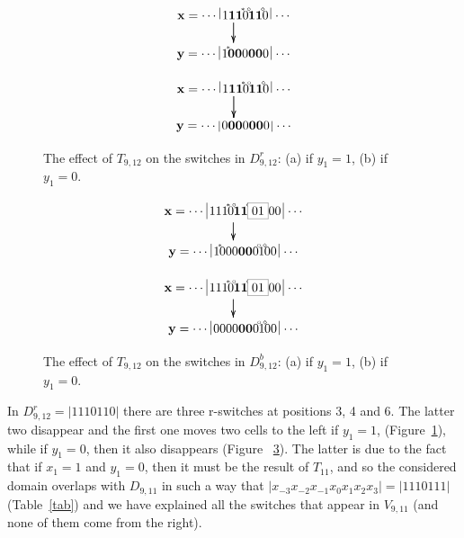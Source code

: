 \documentclass{sn-jnl}
\newcommand{\lllp}{\vline}
\newcommand{\bx}{\mathbf{x}}
\newcommand{\by}{\mathbf{y}}
\newcommand{\gn}[1]{\!^{{}^{{#1}}}\!\!}
\begin{document}
\begin{figure}[h!b]
    \centering
    \begin{subfigure}{0.46\textwidth}
{\scriptsize\[
\xymatrix@C=0.2cm@R=0.5cm{ 
\bx = \cdots \;\lllp  1{\boldsymbol{11}}\gn{*}0\gn{\circ}{\boldsymbol{11}}\gn{\diamond} \ar[d]  0\,\lllp\,\cdots\ar[d]  \\
\by = \cdots \;\lllp1\gn{*}{\boldsymbol{00}}0{\boldsymbol{00}} 0\,\lllp\,\cdots 
}
\]}
    \caption{}
    \label{fig:t9t12(a)}
\end{subfigure}
\hfill
\begin{subfigure}{0.45\textwidth}
{\scriptsize\[
\xymatrix@C=0.2cm@R=0.5cm{ 
\bx = \cdots \;\lllp 1{\boldsymbol{11}}\gn{*}0\gn{\circ}{\boldsymbol{11}}\gn{\diamond} \ar[d]  0\,\lllp\,\cdots\ar[d]  \\
\by = \cdots \;\lllp0{\boldsymbol{00}}0{\boldsymbol{00}} 0\,\lllp\,\cdots 
}
\]}
    \caption{}
    \label{fig:t9t12(b)} 
\end{subfigure}
\caption{The effect of $T_{9,12}$ on the switches in $D_{9,12}^r$:
        (a) if $y_1=1$, (b) if $y_1=0$.}
\end{figure}
\begin{figure}[h!]
    \centering
    \begin{subfigure}{0.46\textwidth}
{\scriptsize\[
\xymatrix@C=0.2cm@R=0.5cm{ 
\bx = \cdots \;\lllp  111\gn{*}0\gn{\circ}{\boldsymbol{11}} \ar[d]  \gn{\diamond}\fcolorbox{gray}{white}{01}00\,\lllp\,\cdots\ar[d]  \\
\by = \cdots \;\lllp1\gn{*}000{\boldsymbol{00}}0  \gn{\circ}1\gn{\diamond}00\,\lllp\,\cdots 
}
\]}
    \caption{}
    \label{fig:t9t12-cd(a)}
\end{subfigure}
\hfill
\begin{subfigure}{0.45\textwidth}
{\scriptsize\[
\xymatrix@C=0.2cm@R=0.5cm{ 
\bx =\cdots \;\lllp  {111}\gn{*}0\gn{\circ}\boldsymbol{11} \ar[d]  \gn{\diamond}\fcolorbox{gray}{white}{01}00\,\lllp\,\cdots\ar[d]  \\
\by = \cdots \;\lllp0000\boldsymbol{00}0   \gn{\circ}1\gn{\diamond}00\,\lllp\,\cdots 
}
\]}
    \caption{}
    \label{fig:t9t12-cd(b)} 
\end{subfigure}
\caption{The effect of $T_{9,12}$ on the switches in $D_{9,12}^b$: 
        (a) if $y_1=1$, (b) if $y_1=0$.}
\end{figure}

In $D_{9,12}^r=|1110110|$ there are three r-switches at positions 3, 4 and 6. The latter two disappear and the first one moves two cells to the left if $y_1=1$, (Figure~\ref{fig:t9t12(a)}), while if $y_1=0$, then it also disappears (Figure ~\ref{fig:t9t12(b)}). The latter is due to the fact that if $x_1=1$ and $y_1=0$, then it must be the result of $T_{11}$, and so the considered domain overlaps with $D_{9,11}$ in such a way that $|x_{-3}x_{-2}x_{-1}x_{0}x_{1}x_{2}x_{3}|=|1110111|$ (Table~\ref{tab}) and we have explained all the switches that appear in $V_{9,11}$ (and none of them come from the right). 
\end{document}

